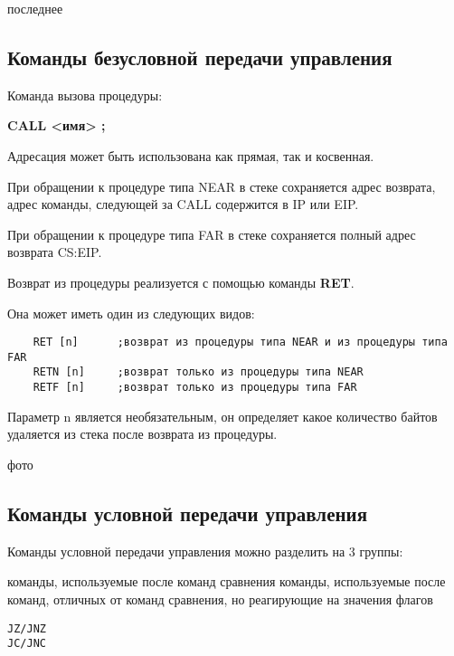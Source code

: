 последнее 
\subsection{Команды безусловной передачи управления}
Команда вызова процедуры:
\begin{center}
    \textbf{CALL <имя> ;}
\end{center}
Адресация может быть использована как прямая, так и косвенная.

При обращении к процедуре типа NEAR в стеке сохраняется адрес возврата, адрес команды, следующей за CALL содержится в IP или EIP.

При обращении к процедуре типа FAR в стеке сохраняется полный адрес возврата CS:EIP.

Возврат из процедуры реализуется с помощью команды \textbf{RET}.

Она может иметь один из следующих видов:
\begin{verbatim}
    RET [n]      ;возврат из процедуры типа NEAR и из процедуры типа FAR
    RETN [n]     ;возврат только из процедуры типа NEAR
    RETF [n]     ;возврат только из процедуры типа FAR
\end{verbatim}
Параметр n является необязательным, он определяет какое количество байтов удаляется из стека после возврата из процедуры.

фото


\subsection{Команды условной передачи управления}
Команды условной передачи управления можно разделить на 3 группы:

команды, используемые после команд сравнения
команды, используемые после команд, отличных от команд сравнения, но реагирующие на значения флагов
\begin{verbatim}
JZ/JNZ
JC/JNC

\end{verbatim}
